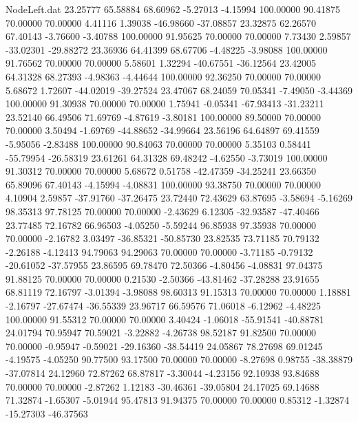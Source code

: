 \begin{filecontents}{NodeLeft.dat}
  23.25777   65.58884   68.60962    -5.27013   -4.15994  100.00000   90.41875   70.00000   70.00000    4.41116    1.39038  -46.98660  -37.08857
  23.32875   62.26570   67.40143    -3.76600   -3.40788  100.00000   91.95625   70.00000   70.00000    7.73430    2.59857  -33.02301  -29.88272
  23.36936   64.41399   68.67706    -4.48225   -3.98088  100.00000   91.76562   70.00000   70.00000    5.58601    1.32294  -40.67551  -36.12564
  23.42005   64.31328   68.27393    -4.98363   -4.44644  100.00000   92.36250   70.00000   70.00000    5.68672    1.72607  -44.02019  -39.27524
  23.47067   68.24059   70.05341    -7.49050   -3.44369  100.00000   91.30938   70.00000   70.00000    1.75941   -0.05341  -67.93413  -31.23211
  23.52140   66.49506   71.69769    -4.87619   -3.80181  100.00000   89.50000   70.00000   70.00000    3.50494   -1.69769  -44.88652  -34.99664
  23.56196   64.64897   69.41559    -5.95056   -2.83488  100.00000   90.84063   70.00000   70.00000    5.35103    0.58441  -55.79954  -26.58319
  23.61261   64.31328   69.48242    -4.62550   -3.73019  100.00000   91.30312   70.00000   70.00000    5.68672    0.51758  -42.47359  -34.25241
  23.66350   65.89096   67.40143    -4.15994   -4.08831  100.00000   93.38750   70.00000   70.00000    4.10904    2.59857  -37.91760  -37.26475
  23.72440   72.43629   63.87695    -3.58694   -5.16269   98.35313   97.78125   70.00000   70.00000   -2.43629    6.12305  -32.93587  -47.40466
  23.77485   72.16782   66.96503    -4.05250   -5.59244   96.85938   97.35938   70.00000   70.00000   -2.16782    3.03497  -36.85321  -50.85730
  23.82535   73.71185   70.79132    -2.26188   -4.12413   94.79063   94.29063   70.00000   70.00000   -3.71185   -0.79132  -20.61052  -37.57955
  23.86595   69.78470   72.50366    -4.80456   -4.08831   97.04375   91.88125   70.00000   70.00000    0.21530   -2.50366  -43.81462  -37.28288
  23.91655   68.81119   72.16797    -3.01394   -3.98088   98.60313   91.15313   70.00000   70.00000    1.18881   -2.16797  -27.67474  -36.55339
  23.96717   66.59576   71.06018    -6.12962   -4.48225  100.00000   91.55312   70.00000   70.00000    3.40424   -1.06018  -55.91541  -40.88781
  24.01794   70.95947   70.59021    -3.22882   -4.26738   98.52187   91.82500   70.00000   70.00000   -0.95947   -0.59021  -29.16360  -38.54419
  24.05867   78.27698   69.01245    -4.19575   -4.05250   90.77500   93.17500   70.00000   70.00000   -8.27698    0.98755  -38.38879  -37.07814
  24.12960   72.87262   68.87817    -3.30044   -4.23156   92.10938   93.84688   70.00000   70.00000   -2.87262    1.12183  -30.46361  -39.05804
  24.17025   69.14688   71.32874    -1.65307   -5.01944   95.47813   91.94375   70.00000   70.00000    0.85312   -1.32874  -15.27303  -46.37563

\end{filecontents}
